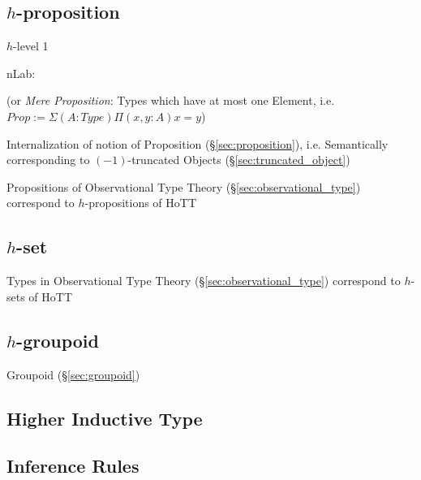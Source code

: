 \subsection{$h$-proposition}\label{sec:h_proposition}

$h$-level 1

nLab:

(or \emph{Mere Proposition}: Types which have at most one Element,
i.e. $Prop := \Sigma(A : Type) \Pi(x, y : A) x = y$)

Internalization of notion of Proposition (\S\ref{sec:proposition}),
i.e. Semantically corresponding to $(-1)$-truncated Objects
(\S\ref{sec:truncated_object})

Propositions of Observational Type Theory
(\S\ref{sec:observational_type}) correspond to $h$-propositions of HoTT



\subsection{$h$-set}\label{sec:h_set}

Types in Observational Type Theory (\S\ref{sec:observational_type})
correspond to $h$-sets of HoTT



\subsection{$h$-groupoid}\label{sec:h_groupoid}

Groupoid (\S\ref{sec:groupoid})



\subsection{Higher Inductive Type}\label{sec:higher_inductive_type}

\subsection{Inference Rules}\label{sec:homotopy_rules}

